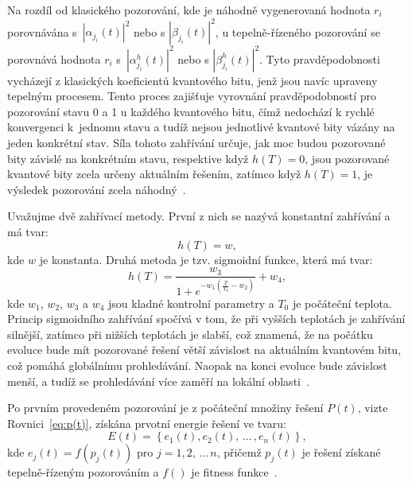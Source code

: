 Na rozdíl od klasického pozorování, kde je náhodně vygenerovaná hodnota $r_i$ porovnávána s~$\left|\alpha_{j_i}\left(t\right) \right|^2$ nebo s $\left|\beta_{j_i}\left(t\right) \right|^2$, u tepelně-řízeného pozorování se porovnává hodnota $r_i$ s~$\left|\alpha_{j_i}^h\left(t\right) \right|^2$ nebo s $\left|\beta_{j_i}^h\left(t\right) \right|^2$. 
Tyto pravděpodobnosti vycházejí z klasických koeficientů kvantového bitu, jenž jsou navíc upraveny tepelným procesem. 
Tento proces zajišťuje vyrovnání pravděpodobností pro pozorování stavu 0 a 1 u každého kvantového bitu, čímž nedochází k rychlé konvergenci k~jednomu stavu a tudíž nejsou jednotlivé kvantové bity vázány na jeden konkrétní stav. 
Síla tohoto zahřívání určuje, jak moc budou pozorované bity závislé na konkrétním stavu, respektive když $h\left(T\right) = 0$, jsou pozorované kvantové bity zcela určeny aktuálním řešením, zatímco když $h\left(T\right) = 1$, je výsledek pozorování zcela náhodný~\cite{qisa}. 

Uvažujme dvě zahřívací metody. První z nich se nazývá konstantní zahřívání a má tvar:
\begin{equation}\label{eq:qisa-const}
    h\left(T\right) = w,
\end{equation}
kde $w$ je konstanta. Druhá metoda je tzv. sigmoidní funkce, která má tvar:
\begin{equation}\label{eq:qisa-sigmo}
    h\left(T\right) = \frac{w_3}{1 + e^{-w_1 \left(\frac{T}{T_0} - w_2 \right)}} + w_4,
\end{equation}
kde $w_1$, $w_2$, $w_3$ a $w_4$ jsou kladné kontrolní parametry a $T_0$ je počáteční teplota. 
Princip sigmoidního zahřívání spočívá v tom, že při vyšších teplotách je zahřívání silnější, zatímco při nižších teplotách je slabší, což znamená, že na počátku evoluce bude mít pozorované řešení větší závislost na aktuálním kvantovém bitu, což pomáhá globálnímu prohledávání. 
Naopak na konci evoluce bude závislost menší, a tudíž se prohledávání více zaměří na lokální oblasti~\cite{qisa}. 

Po prvním provedeném pozorování je z počáteční množiny řešení $P\left(t\right)$, vizte Rovnici~\ref{eq:p(t)}, získána prvotní energie řešení ve tvaru:
\begin{equation*}
    E\left(t\right) = \left\{ e_1\left(t\right), e_2\left(t\right),\,\dots\,, e_n\left(t\right) \right\},
\end{equation*}
kde $e_j \left( t \right) = f\left( p_j \left( t \right) \right)$ pro $j = 1,2,\,\dots\,n$, přičemž $p_j\left( t \right)$ je řešení získané tepelně-řízeným pozorováním a $f\left( \right)$ je fitness funkce~\cite{qisa}.

